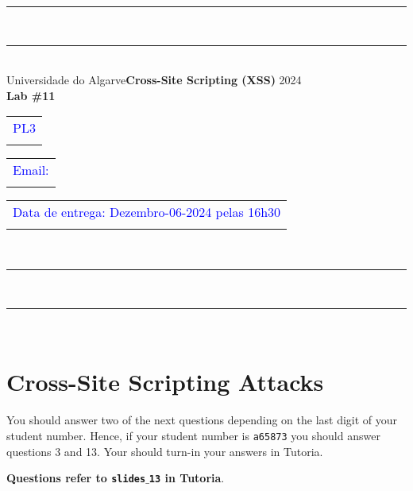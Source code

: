 \documentclass{article}
\begin{document}
\begin{center}
\rule{\textwidth}{.0075in} \\
\rule[3mm]{\textwidth}{.0075in}\\

Universidade do Algarve\hfill \textbf{Cross-Site Scripting (XSS)} \hfill 2024\\[3ex]

{\Large\bf Lab \#11} \\[3ex]

\begin{tabular}{l}
\textcolor{blue}{PL3} \\ \hfill 
\end{tabular}
\begin{tabular}{l}
\textcolor{blue}{Email:} \\ \hfill 
\end{tabular}
\begin{tabular}{l}
\textcolor{blue}{Data de entrega: Dezembro-06-2024 pelas 16h30} \\ \hfill 
\end{tabular}\\

\rule{\textwidth}{.0075in} \\
\rule[3mm]{\textwidth}{.0075in} \\
\end{center}

\section*{Cross-Site Scripting Attacks}
You should answer two of the next questions depending on the last digit of your student
number. Hence, if your student number is \texttt{a65873} you should answer
questions 3 and 13. Your should turn-in your answers in Tutoria.

\bigskip 
\bigskip

{\large
  \noindent \textbf{Questions refer to \texttt{slides$\_$13} in Tutoria}. 
}
\bigskip
\bigskip
\end{document}
